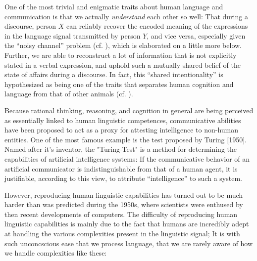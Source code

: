 
One of the most trivial and enigmatic traits about human language and communication is
that we actually \emph{understand} each other so well: That during a discourse, person
$X$ can reliably recover the encoded meaning of the expressions in the language signal
transmitted by person $Y$, and vice versa, especially given the ``noisy channel'' problem (cf.
\cite{plotkin2000language}), which is elaborated on a little more below. Further, we are
able to reconstruct a lot of information that is not explicitly stated in a verbal expression, and
uphold such a mutually shared belief of the state of affairs during a discourse. In fact,
this ``shared intentionality'' is hypothesized as being one of the traits that separates
human cognition and language from that of other animals (cf. \cite{tomasello2007shared}).

Because rational thinking, reasoning, and cognition in general are being perceived
as essentially linked to human linguistic competences, communicative abilities have been proposed
to act as a proxy for attesting intelligence to non-human entities. One of the most famous example
is the test proposed by Turing [1950]. Named after it's inventor, the "Turing-Test" is a method
for determining the capabilities of artificial intelligence systems: If the communicative behavior
of an artificial communicator is indistinguishable from that of a human agent, it is justifiable,
according to this view, to attribute ``intelligence'' to such a system.

However, reproducing human linguistic capabilities has turned out to be much
harder than was predicted during the 1950s, where scientists were enthused by
then recent developments of computers. The
difficulty of reproducing human linguistic capabilities is mainly due to the
fact that humans are incredibly adept at handling the various complexities
present in the linguistic signal; It is with such unconcscious ease that we
process language, that we are rarely aware of how we handle complexities like
these:

